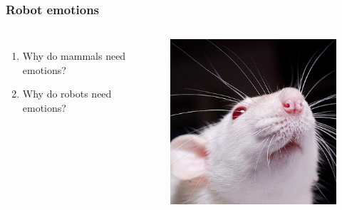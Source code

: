 \documentclass[12pt]{beamer}
\begin{document}

\begin{frame}
\frametitle{Robot emotions}
\begin{columns}[c] %

\begin{enumerate}
\item Why do mammals need emotions?
\item Why do robots need emotions?
\end{enumerate}

\begin{figure}
\includegraphics[width=1.0\linewidth]{rat}
\end{figure}


\end{columns}
\end{frame}
\end{document}
